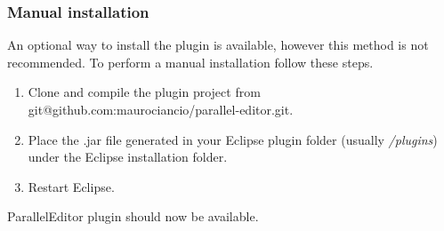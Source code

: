 \subsubsection{Manual installation}

An optional way to install the plugin is available, however this method is not recommended. To perform a manual installation follow these steps.

\begin{enumerate}
\item
  Clone and compile the plugin project from
  git@github.com:maurociancio/parallel-editor.git.
\item
  Place the .jar file generated in your Eclipse plugin folder
  (usually \emph{/plugins}) under the Eclipse installation folder.
\item
  Restart Eclipse.
\end{enumerate}
ParallelEditor plugin should now be available.

